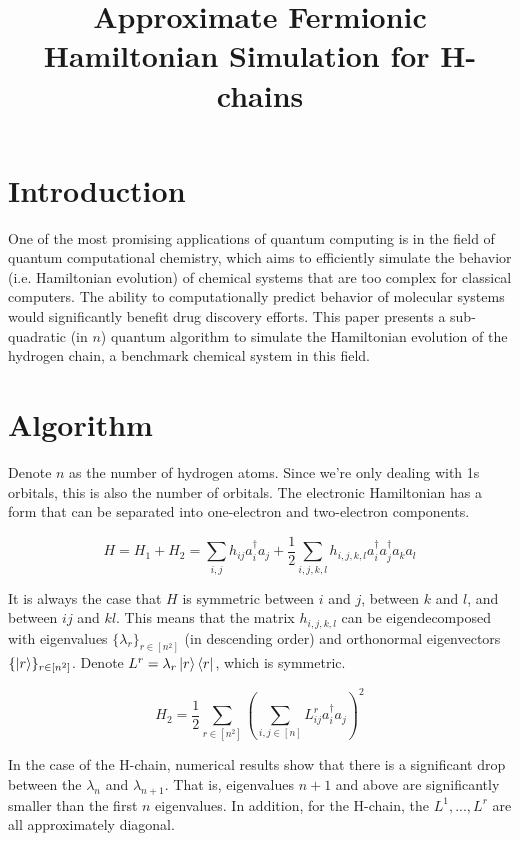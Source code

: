 \documentclass{article}
\begin{document}
\title{Approximate Fermionic Hamiltonian Simulation for H-chains}

\maketitle

\section{Introduction}

One of the most promising applications of quantum computing is in the field of quantum computational chemistry, which aims to efficiently simulate the behavior (i.e. Hamiltonian evolution) of chemical systems that are too complex for classical computers. The ability to computationally predict behavior of molecular systems would significantly benefit drug discovery efforts. This paper presents a sub-quadratic (in $n$) quantum algorithm to simulate the Hamiltonian evolution of the hydrogen chain, a benchmark chemical system in this field.

\section{Algorithm}

Denote $n$ as the number of hydrogen atoms. Since we're only dealing with 1s orbitals, this is also the number of orbitals. The electronic Hamiltonian has a form that can be separated into one-electron and two-electron components.

\begin{equation}
    H = H_1 + H_2 = \sum_{i, j} h_{ij}a_i^\dag a_j + \frac{1}{2}\sum_{i, j, k, l} h_{i, j, k, l} a_i^\dag a_j^\dag a_ka_l
\end{equation}

It is always the case that $H$ is symmetric between $i$ and $j$, between $k$ and $l$, and between $ij$ and $kl$. This means that the matrix $h_{i, j, k, l}$ can be eigendecomposed with eigenvalues $\{\lambda_r\}_{r \in [n^2]}$ (in descending order) and orthonormal eigenvectors $\{\ket{r}\}_{r \in [n^2]}$. Denote $L^r = \lambda_r \ket{r}\bra{r}$, which is symmetric.

\begin{equation}
    H_2 = \frac{1}{2}\sum_{r \in [n^2]} (\sum_{i, j \in [n]} L^r_{ij}a_i^\dag a_j)^2
\end{equation}

In the case of the H-chain, numerical results show that there is a significant drop between the $\lambda_n$ and $\lambda_{n + 1}$. That is, eigenvalues $n + 1$ and above are significantly smaller than the first $n$ eigenvalues. %
In addition, for the H-chain, the $L^1, ..., L^r$ are all approximately diagonal. %
\end{document}
